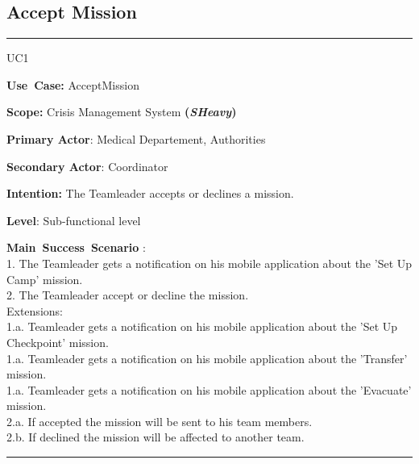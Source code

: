\subsection{Accept Mission}
\vspace{0.5cm}
\hrule
\vspace{0.5cm}
\begin{lyxlist}{UC1}
\small{
\item [\textbf{Use~Case:}] AcceptMission
\item [\textbf{Scope:}] Crisis Management System \textbf{(\emph{SHeavy})}
\item [\textbf{Primary Actor}:] Medical Departement, Authorities
\item [\textbf{Secondary Actor}:] Coordinator
\item [\textbf{Intention:}]The Teamleader accepts or declines a mission.
\item [\textbf{Level}:]Sub-functional level
\item [\textbf{Main~Success~Scenario}]:\\
1. The Teamleader gets a notification on his mobile application about the
'Set Up Camp' mission.\\
2. The Teamleader accept or decline the mission.\\
Extensions:\\
	1.a.  Teamleader gets a notification on his mobile application about the
'Set Up Checkpoint' mission.\\
	1.a.  Teamleader gets a notification on his mobile application about the
'Transfer' mission.\\
	1.a.  Teamleader gets a notification on his mobile application about the
'Evacuate' mission.\\
	2.a. If accepted the mission will be sent to his team members.\\
	2.b. If declined the mission will be affected to another team.\\ 
}
\end{lyxlist}
\hrule 
\vspace{0.5cm} 

